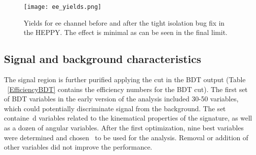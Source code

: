 \begin{figure}[tbp]
  \begin{center}
    \texttt{[image: ee\_yields.png]}
    \caption{Yields for ee channel before and after the tight isolation bug fix in the HEPPY. The effect is minimal as can be seen in the final limit. }
    \label{fig:yields_ee}
  \end{center}
\end{figure}



\subsection{Signal and background characteristics}

The signal region is further purified applying the cut in the BDT
output (Table ~\ref{EfficiencyBDT} contains the efficiency numbers for the BDT cut). 
The first set of BDT variables in the early version of the analysis included 30-50 variables, which could potentially discriminate signal from the background. The set containe\
d variables related to the kinematical properties of the signature, as well as a dozen of angular variables. After the first optimization, nine best variables were determined and chosen \
to be used for the analysis. Removal or addition of other variables did not improve the performance. %


